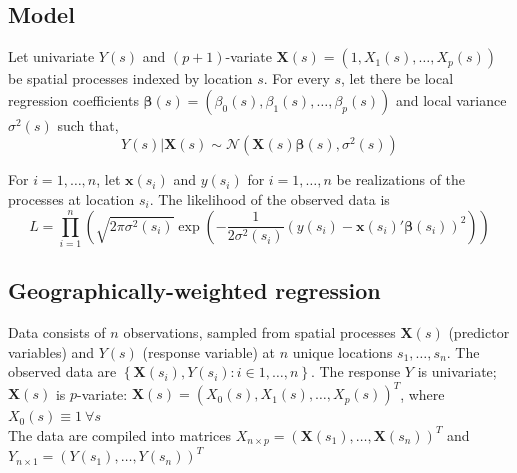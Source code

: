 \documentclass[authoryear, review, 11pt]{elsarticle}
\begin{document}
	\subsection{Model}
	Let univariate $Y(s)$ and $(p+1)$-variate $\bm{X}(s) = \left( 1, X_1(s), \dots, X_p(s) \right)$ be spatial processes indexed by location $s$. For every $s$, let there be local regression coefficients $\bm{\beta}(s) = \left( \beta_0(s), \beta_1(s), \dots, \beta_p(s) \right)$ and local variance $\sigma^2(s)$ such that, 
	\[
		Y(s) | \bm{X}(s) \sim \mathcal{N} \left( \bm{X}(s) \bm{\beta}(s), \sigma^2(s) \right)
	\]
	
	 For $i = 1, \dots, n$, let $\bm{x}(s_i)$ and $y(s_i)$ for $i = 1, \dots, n$ be realizations of the processes at location $s_i$. The likelihood of the observed data is 
	 \[
	 	L = \prod_{i=1}^n \left( \sqrt{2 \pi \sigma^2(s_i)} \exp \left(-\frac{1}{2\sigma^2\left(s_i\right)} \left(y(s_i) - \bm{x}(s_i)'\bm{\beta}(s_i) \right)^2 \right) \right)
	\]
	
	\subsection{Geographically-weighted regression}

	
	
	
	
	Data consists of $n$ observations, sampled from spatial processes $\bm{X}(s)$ (predictor variables) and $Y(s)$ (response variable) at $n$ unique locations $s_1, \dots, s_n$. The observed data are $\left\{ \bm{X}(s_i) , Y(s_i) : i \in 1, \dots, n \right\}$. The response $Y$ is univariate; $\bm{X}(s)$ is $p$-variate: $\bm{X}(s) = (X_0(s), X_1(s), \dots, X_p(s))^T$, where $X_0(s) \equiv 1 \: \forall s$ \\
	
	The data are compiled into matrices $X_{n \times p} = \left( \bm{X}(s_1), \dots, \bm{X}(s_n) \right)^T$ and $Y_{n \times 1} = \left(Y(s_1), \dots, Y(s_n) \right)^T$\\
		
\end{document}
